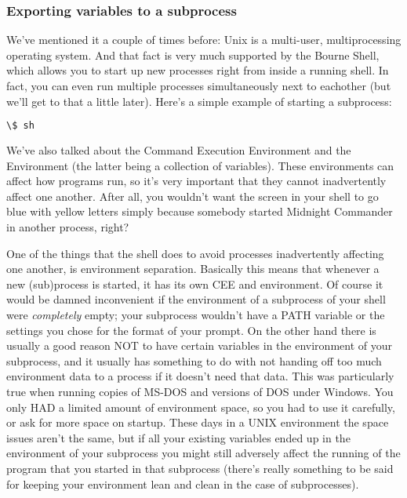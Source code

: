 \subsubsection{Exporting variables to a subprocess}
We've mentioned it a couple of times before: Unix is a multi-user,
multiprocessing operating system. And that fact is very much supported by the
Bourne Shell, which allows you to start up new processes right from inside a
running shell. In fact, you can even run multiple processes simultaneously next
to eachother (but we'll get to that a little later). Here's a simple example of
starting a subprocess: 
\lstset{basicstyle=\scriptsize, numbers=left, captionpos=b, tabsize=4}
\begin{lstlisting}[caption=Starting a new shell from the shell,language={bash},
xleftmargin=15pt, label=lst:Starting a new shell from the shell]
\$ sh
\end{lstlisting}

We've also talked about the Command Execution Environment and the Environment
(the latter being a collection of variables). These environments can affect how
programs run, so it's very important that they cannot inadvertently affect one
another. After all, you wouldn't want the screen in your shell to go blue with
yellow letters simply because somebody started Midnight Commander in another
process, right? 

One of the things that the shell does to avoid processes inadvertently
affecting one another, is environment separation. Basically this means that
whenever a new (sub)process is started, it has its own CEE and environment. Of
course it would be damned inconvenient if the environment of a subprocess of
your shell were \textit{completely} empty; your subprocess wouldn't have a PATH
variable or the settings you chose for the format of your prompt. On the other
hand there is usually a good reason NOT to have certain variables in the
environment of your subprocess, and it usually has something to do with not
handing off too much environment data to a process if it doesn't need that
data. This was particularly true when running copies of MS-DOS and versions of
DOS under Windows. You only HAD a limited amount of environment space, so you
had to use it carefully, or ask for more space on startup. These days in a UNIX
environment the space issues aren't the same, but if all your existing
variables ended up in the environment of your subprocess you might still
adversely affect the running of the program that you started in that subprocess
(there's really something to be said for keeping your environment lean and
clean in the case of subprocesses).

